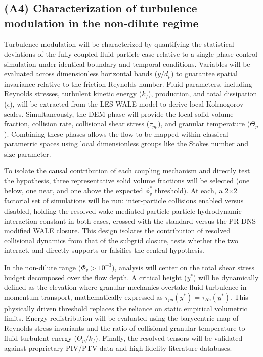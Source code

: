 \hypertarget{a4-characterization-of-turbulence-modulation-in-the-non-dilute-regime}{%
\subsection{\texorpdfstring{ (A4) Characterization of turbulence modulation in the non-dilute regime }{ (A4) Characterization of turbulence modulation in the non-dilute regime }}\label{a4-characterization-of-turbulence-modulation-in-the-non-dilute-regime}}

Turbulence modulation will be characterized by quantifying the statistical deviations of the fully coupled fluid-particle case relative to a single-phase control simulation under identical boundary and temporal conditions. Variables will be evaluated across dimensionless horizontal bands (\(y/d_{p}\)) to guarantee spatial invariance relative to the friction Reynolds number. Fluid parameters, including Reynolds stresses, turbulent kinetic energy (\(k_{f}\)), production, and total dissipation (\(\epsilon\)), will be extracted from the LES-WALE model to derive local Kolmogorov scales. Simultaneously, the DEM phase will provide the local solid volume fraction, collision rate, collisional shear stress (\(\tau_{pp}\)), and granular temperature (\(\Theta_{p}\)). Combining these phases allows the flow to be mapped within classical parametric spaces using local dimensionless groups like the Stokes number and size parameter.

To isolate the causal contribution of each coupling mechanism and directly test the hypothesis, three representative solid volume fractions will be selected (one below, one near, and one above the expected \(\phi_{v}^{*}\) threshold). At each, a 2\(\times\)2 factorial set of simulations will be run: inter-particle collisions enabled versus disabled, holding the resolved wake-mediated particle-particle hydrodynamic interaction constant in both cases, crossed with the standard versus the PR-DNS-modified WALE closure. This design isolates the contribution of resolved collisional dynamics from that of the subgrid closure, tests whether the two interact, and directly supports or falsifies the central hypothesis.

In the non-dilute range (\(\Phi_{v} > 10^{- 3}\)), analysis will center on the total shear stress budget decomposed over the flow depth. A critical height (\(y^{*}\)) will be dynamically defined as the elevation where granular mechanics overtake fluid turbulence in momentum transport, mathematically expressed as \(\tau_{pp}\left( y^{*} \right) = \tau_{Re}\left( y^{*} \right)\). This physically driven threshold replaces the reliance on static empirical volumetric limits. Energy redistribution will be evaluated using the barycentric map of Reynolds stress invariants and the ratio of collisional granular temperature to fluid turbulent energy (\(\Theta_{p}/k_{f}\)). Finally, the resolved tensors will be validated against proprietary PIV/PTV data and high-fidelity literature databases.


